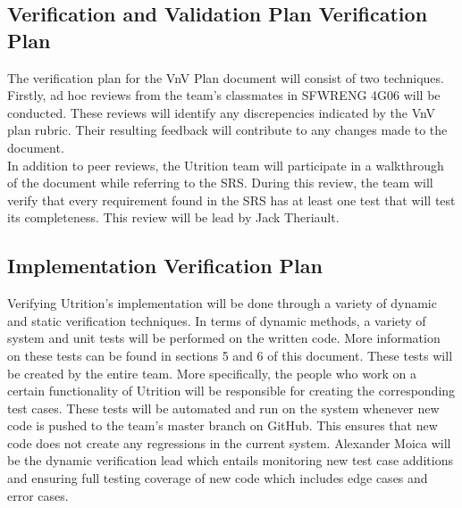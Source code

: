 \documentclass[12pt, titlepage]{article}
\begin{document}
	\subsection{Verification and Validation Plan Verification Plan}
	
	
	
	
	The verification plan for the VnV Plan document will consist of two techniques. Firstly, ad hoc reviews from the team's classmates in SFWRENG 4G06 will be conducted. These reviews will identify any discrepencies indicated by the VnV plan rubric. Their resulting feedback will contribute to any changes made to the document.\\
	
	In addition to peer reviews, the Utrition team will participate in a walkthrough of the document while referring to the SRS. During this review, the team will verify that every requirement found in the SRS has at least one test that will test its completeness. This review will be lead by Jack Theriault. 
	
	\subsection{Implementation Verification Plan}
	
	
	
	Verifying Utrition's implementation will be done through a variety of dynamic and static verification techniques. In terms of dynamic methods, a variety of system and unit tests will be performed on the written code. More information on these tests can be found in sections 5 and 6 of this document. These tests will be created by the entire team. More specifically, the people who work on a certain functionality of Utrition will be responsible for creating the corresponding test cases. These tests will be automated and run on the system whenever new code is pushed to the team's master branch on GitHub. This ensures that new code does not create any regressions in the current system. Alexander Moica will be the dynamic verification lead which entails monitoring new test case additions and ensuring full testing coverage of new code which includes edge cases and error cases.\\
	
\end{document}
